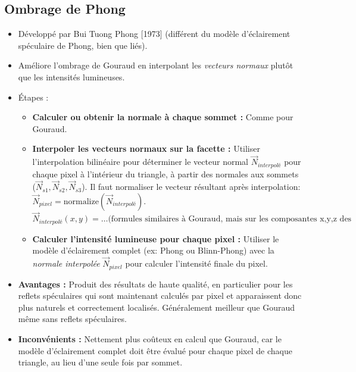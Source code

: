 \subsection{Ombrage de Phong}
\begin{itemize}
    \item Développé par Bui Tuong Phong [1973] (différent du modèle d'éclairement spéculaire de Phong, bien que liés).
    \item Améliore l'ombrage de Gouraud en interpolant les \textit{vecteurs normaux} plutôt que les intensités lumineuses.
    \item Étapes :
        \begin{itemize}
        \item \textbf{Calculer ou obtenir la normale à chaque sommet :} Comme pour Gouraud.
        \item \textbf{Interpoler les vecteurs normaux sur la facette :} Utiliser l'interpolation bilinéaire pour déterminer le vecteur normal \(\vec{N}_{interpolé}\) pour chaque pixel à l'intérieur du triangle, à partir des normales aux sommets (\(\vec{N}_{s1}, \vec{N}_{s2}, \vec{N}_{s3}\)). Il faut normaliser le vecteur résultant après interpolation: \( \vec{N}_{pixel} = \text{normalize}(\vec{N}_{interpolé}) \).
           \[ \vec{N}_{interpolé}(x, y) = \dots \text{(formules similaires à Gouraud, mais sur les composantes x,y,z des normales)} \]
        \item \textbf{Calculer l'intensité lumineuse pour chaque pixel :} Utiliser le modèle d'éclairement complet (ex: Phong ou Blinn-Phong) avec la \textit{normale interpolée} \(\vec{N}_{pixel}\) pour calculer l'intensité finale du pixel.
        \end{itemize}
    \item \textbf{Avantages :} Produit des résultats de haute qualité, en particulier pour les reflets spéculaires qui sont maintenant calculés par pixel et apparaissent donc plus naturels et correctement localisés. Généralement meilleur que Gouraud même sans reflets spéculaires.
    \item \textbf{Inconvénients :} Nettement plus coûteux en calcul que Gouraud, car le modèle d'éclairement complet doit être évalué pour chaque pixel de chaque triangle, au lieu d'une seule fois par sommet.
\end{itemize}
